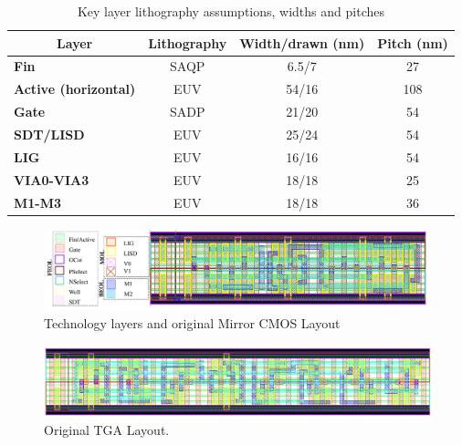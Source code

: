 \documentclass[ecp,tc, english]{iiufrgs}
\begin{document}
\begin{table}[H]
\centering
\caption{Key layer lithography assumptions, widths and pitches}
\label{layers}
\begin{tabular}{lccc}
\hline
\multicolumn{1}{c}{\textbf{Layer}} & \textbf{Lithography} & \textbf{Width/drawn (nm)} & \textbf{Pitch (nm)} \\ \hline
\textbf{Fin}                         & SAQP                 & 6.5/7                     & 27                  \\ \hline
\textbf{Active (horizontal)}         & EUV                  & 54/16                     & 108                 \\ \hline
\textbf{Gate}                        & SADP                 & 21/20                     & 54                  \\ \hline
\textbf{SDT/LISD}                    & EUV                  & 25/24                     & 54                  \\ \hline
\textbf{LIG}                         & EUV                  & 16/16                     & 54                  \\ \hline
\textbf{VIA0-VIA3}                   & EUV                  & 18/18                     & 25                  \\ \hline
\textbf{M1-M3}                       & EUV                  & 18/18                     & 36                  \\ \hline
\end{tabular}
\end{table}

\begin{figure}[H]
\centering
\includegraphics[width=\textwidth]{Layers.pdf}
\caption{Technology layers and original Mirror CMOS Layout}
\label{fig:layers}
\end{figure}

\begin{figure}[H]
\centering
\includegraphics[width=\textwidth]{TGA.png}
\caption{Original TGA Layout.}
\label{fig:TGA}
\end{figure}
\end{document}
